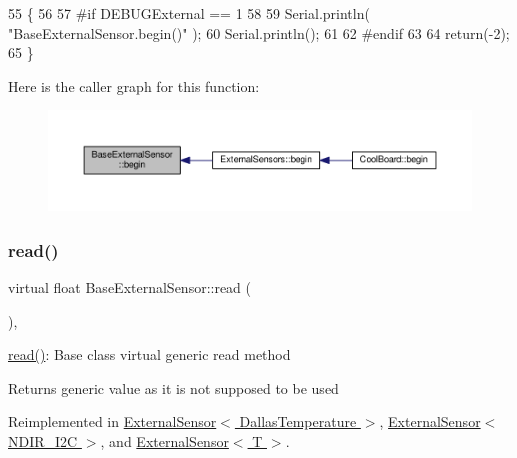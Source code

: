 \begin{DoxyCode}
55     \{
56     
57 \textcolor{preprocessor}{    #if DEBUGExternal == 1 }
58     
59         Serial.println( \textcolor{stringliteral}{"BaseExternalSensor.begin()"} );
60         Serial.println();
61     
62 \textcolor{preprocessor}{    #endif}
63 
64         \textcolor{keywordflow}{return}(-2);
65     \}
\end{DoxyCode}
Here is the caller graph for this function\+:\nopagebreak
\begin{figure}[H]
\begin{center}
\leavevmode
\includegraphics[width=350pt]{d1/d68/class_base_external_sensor_a87d132803d4f4fdd4e66332809f0c9a0_icgraph}
\end{center}
\end{figure}
\mbox{\label{class_base_external_sensor_a1564f16deacf57b51b9948ac29db4291}} 
\subsubsection{\texorpdfstring{read()}{read()}}
{\footnotesize\ttfamily virtual float Base\+External\+Sensor\+::read (\begin{DoxyParamCaption}{ }\end{DoxyParamCaption})\hspace{0.3cm}{\ttfamily [inline]}, {\ttfamily [virtual]}}

\hyperlink{class_base_external_sensor_a1564f16deacf57b51b9948ac29db4291}{read()}\+: Base class virtual generic read method

\begin{DoxyReturn}{Returns}
generic value as it is not supposed to be used 
\end{DoxyReturn}


Reimplemented in \hyperlink{class_external_sensor_3_01_dallas_temperature_01_4_a1e725d9338314515d4e5dc456ed6a6c8}{External\+Sensor$<$ Dallas\+Temperature $>$}, \hyperlink{class_external_sensor_3_01_n_d_i_r___i2_c_01_4_a239d18652e9fb4673842ae9726edf44f}{External\+Sensor$<$ N\+D\+I\+R\+\_\+\+I2\+C $>$}, and \hyperlink{class_external_sensor_a5fb3afc7d244fb86dac68ab5481bc407}{External\+Sensor$<$ T $>$}.



